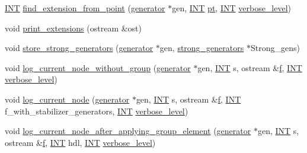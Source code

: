 \begin{DoxyCompactItemize}
\item 
\mbox{\hyperlink{galois_8h_a09fddde158a3a20bd2dcadb609de11dc}{I\+NT}} \mbox{\hyperlink{classoracle_aa6091b5a2260435d706a61ddc06ad1a4}{find\+\_\+extension\+\_\+from\+\_\+point}} (\mbox{\hyperlink{classgenerator}{generator}} $\ast$gen, \mbox{\hyperlink{galois_8h_a09fddde158a3a20bd2dcadb609de11dc}{I\+NT}} \mbox{\hyperlink{classoracle_aa8c6db158546ea7a7e59bac20e981313}{pt}}, \mbox{\hyperlink{galois_8h_a09fddde158a3a20bd2dcadb609de11dc}{I\+NT}} \mbox{\hyperlink{simeon_8_c_a818073fbcc2f439e7c56952f67386122}{verbose\+\_\+level}})
\item 
void \mbox{\hyperlink{classoracle_a6ea212ee0158a6c6146d54f79ba0e9f3}{print\+\_\+extensions}} (ostream \&ost)
\item 
void \mbox{\hyperlink{classoracle_a905d0cad4b33515e581039ed8902b3be}{store\+\_\+strong\+\_\+generators}} (\mbox{\hyperlink{classgenerator}{generator}} $\ast$gen, \mbox{\hyperlink{classstrong__generators}{strong\+\_\+generators}} $\ast$Strong\+\_\+gens)
\item 
void \mbox{\hyperlink{classoracle_a9400cea7437003969b89032e8626c148}{log\+\_\+current\+\_\+node\+\_\+without\+\_\+group}} (\mbox{\hyperlink{classgenerator}{generator}} $\ast$gen, \mbox{\hyperlink{galois_8h_a09fddde158a3a20bd2dcadb609de11dc}{I\+NT}} s, ostream \&\mbox{\hyperlink{alphabet2_8_c_a362077c979b0bb65159c603270e40f70}{f}}, \mbox{\hyperlink{galois_8h_a09fddde158a3a20bd2dcadb609de11dc}{I\+NT}} \mbox{\hyperlink{simeon_8_c_a818073fbcc2f439e7c56952f67386122}{verbose\+\_\+level}})
\item 
void \mbox{\hyperlink{classoracle_a51f9cd387e52812e9a67f4d9cfcca603}{log\+\_\+current\+\_\+node}} (\mbox{\hyperlink{classgenerator}{generator}} $\ast$gen, \mbox{\hyperlink{galois_8h_a09fddde158a3a20bd2dcadb609de11dc}{I\+NT}} s, ostream \&\mbox{\hyperlink{alphabet2_8_c_a362077c979b0bb65159c603270e40f70}{f}}, \mbox{\hyperlink{galois_8h_a09fddde158a3a20bd2dcadb609de11dc}{I\+NT}} f\+\_\+with\+\_\+stabilizer\+\_\+generators, \mbox{\hyperlink{galois_8h_a09fddde158a3a20bd2dcadb609de11dc}{I\+NT}} \mbox{\hyperlink{simeon_8_c_a818073fbcc2f439e7c56952f67386122}{verbose\+\_\+level}})
\item 
void \mbox{\hyperlink{classoracle_a83654fe90c42572ee993416b5d1c4cb5}{log\+\_\+current\+\_\+node\+\_\+after\+\_\+applying\+\_\+group\+\_\+element}} (\mbox{\hyperlink{classgenerator}{generator}} $\ast$gen, \mbox{\hyperlink{galois_8h_a09fddde158a3a20bd2dcadb609de11dc}{I\+NT}} s, ostream \&\mbox{\hyperlink{alphabet2_8_c_a362077c979b0bb65159c603270e40f70}{f}}, \mbox{\hyperlink{galois_8h_a09fddde158a3a20bd2dcadb609de11dc}{I\+NT}} hdl, \mbox{\hyperlink{galois_8h_a09fddde158a3a20bd2dcadb609de11dc}{I\+NT}} \mbox{\hyperlink{simeon_8_c_a818073fbcc2f439e7c56952f67386122}{verbose\+\_\+level}})

\end{DoxyCompactItemize}
